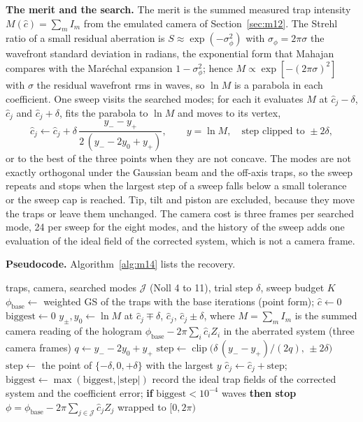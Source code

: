 \textbf{The merit and the search.} The merit is the summed measured trap intensity $M(\hat c)=\sum_mI_m$ from the emulated camera of Section~\ref{sec:m12}. The Strehl ratio of a small residual aberration is $S\approx\exp(-\sigma_\phi^2)$ with $\sigma_\phi=2\pi\sigma$ the wavefront standard deviation in radians, the exponential form that Mahajan~\cite{mahajan1983} compares with the Mar\'echal expansion $1-\sigma_\phi^2$; hence $M\propto\exp[-(2\pi\sigma)^2]$ with $\sigma$ the residual wavefront rms in waves, so $\ln M$ is a parabola in each coefficient. One sweep visits the searched modes; for each it evaluates $M$ at $\hat c_j-\delta$, $\hat c_j$ and $\hat c_j+\delta$, fits the parabola to $\ln M$ and moves to its vertex,
\begin{equation}
\hat c_j\leftarrow\hat c_j+\delta\,\frac{y_--y_+}{2\,(y_--2y_0+y_+)},\qquad y=\ln M,\quad\text{step clipped to }\pm2\delta,
\label{eq:m14-step}
\end{equation}
or to the best of the three points when they are not concave. The modes are not exactly orthogonal under the Gaussian beam and the off-axis traps, so the sweep repeats and stops when the largest step of a sweep falls below a small tolerance or the sweep cap is reached. Tip, tilt and piston are excluded, because they move the traps or leave them unchanged. The camera cost is three frames per searched mode, 24 per sweep for the eight modes, and the history of the sweep adds one evaluation of the ideal field of the corrected system, which is not a camera frame.

\textbf{Pseudocode.} Algorithm~\ref{alg:m14} lists the recovery.

\begin{algorithm}[t]
\caption{Sensorless modal recovery of the Zernike coefficients on the emulated camera: a parabola fit of $\ln M$ in each searched mode, repeated over sweeps.}
\label{alg:m14}
\begin{algorithmic}[1]
\Require traps, camera, searched modes $\mathcal J$ (Noll 4 to 11), trial step $\delta$, sweep budget $K$
\State $\phi_{\mathrm{base}}\gets$ weighted GS of the traps with the base iterations (point form); $\hat c\gets0$
  \State $\mathrm{biggest}\gets0$
    \State $y_\pm,y_0\gets\ln M$ at $\hat c_j\mp\delta$, $\hat c_j$, $\hat c_j\pm\delta$, where $M=\sum_m I_m$ is the summed camera reading of the hologram $\phi_{\mathrm{base}}-2\pi\sum_i\hat c_iZ_i$ in the aberrated system (three camera frames)
    \State $q\gets y_--2y_0+y_+$
     \State $\mathrm{step}\gets\operatorname{clip}\big(\delta\,(y_--y_+)/(2q),\,\pm2\delta\big)$
    \Else \State $\mathrm{step}\gets$ the point of $\{-\delta,0,+\delta\}$ with the largest $y$ \EndIf
    \State $\hat c_j\gets\hat c_j+\mathrm{step}$; $\mathrm{biggest}\gets\max(\mathrm{biggest},|\mathrm{step}|)$
  \EndFor
  \State record the ideal trap fields of the corrected system and the coefficient error; \textbf{if} $\mathrm{biggest}<10^{-4}$ waves \textbf{then stop}
\EndFor
\State \Return $\phi=\phi_{\mathrm{base}}-2\pi\sum_{j\in\mathcal J}\hat c_jZ_j$ wrapped to $[0,2\pi)$
\end{algorithmic}
\end{algorithm}

